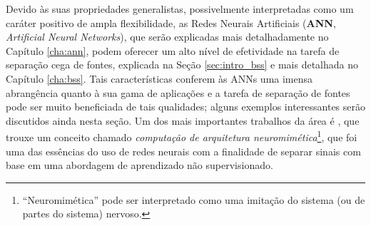 Devido às suas propriedades generalistas, possivelmente interpretadas como um caráter positivo de ampla flexibilidade, as Redes Neurais Artificiais (\textbf{ANN}, \textit{Artificial Neural Networks}), que serão explicadas mais detalhadamente no Capítulo \ref{cha:ann}, podem oferecer um alto nível de efetividade na tarefa de separação cega de fontes, explicada na Seção \ref{sec:intro_bss} e mais detalhada no Capítulo \ref{cha:bss}. Tais características conferem às ANNs uma imensa abrangência quanto à sua gama de aplicações e a tarefa de separação de fontes pode ser muito beneficiada de tais qualidades; alguns exemplos interessantes serão discutidos ainda nesta seção. Um dos mais importantes trabalhos da área é \citep{herault1985detection}, que trouxe um conceito chamado \textit{computação de arquitetura neuromimética}\footnote{``Neuromimética'' pode ser interpretado como uma imitação do sistema (ou de partes do sistema) nervoso.}, que foi uma das essências do uso de redes neurais com a finalidade de separar sinais com base em uma abordagem de aprendizado não supervisionado.






